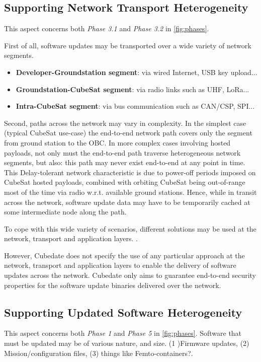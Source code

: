 \subsection{Supporting Network Transport Heterogeneity}
This aspect concerns both \textit{Phase 3.1} and \textit{Phase 3.2} in \autoref{fig:phases}. 

First of all, software updates may be transported over a wide variety of network segments.
\begin{itemize}
\item {\bf Developer-Groundstation segment}: via wired Internet, USB key upload...
\item {\bf Groundstation-CubeSat segment}: via radio links such as UHF, LoRa...
\item {\bf Intra-CubeSat segment}: via bus communication such as CAN/CSP, SPI...
\end{itemize}

Second, paths across the network may vary in complexity.
In the simplest case (typical CubeSat use-case) the end-to-end network path covers only the segment from ground station to the OBC.
In more complex cases involving hosted payloads, not only
must the end-to-end path traverse heterogeneous network segments,
but also: this path may never exist end-to-end at any point in time.
This Delay-tolerant network characteristic is due to power-off periods imposed on CubeSat hosted payloads, 
combined with orbiting CubeSat being out-of-range most of the time via radio w.r.t. available ground stations.
Hence, while in transit across the network, software update data may have to be temporarily cached at some intermediate node along the path.

To cope with this wide variety of scenarios, different solutions may be used at the network, transport and application layers. . 


However, Cubedate does not specify the use of any particular approach at the network, transport and application layers to enable the delivery of software updates across the network.
Cubedate only aims to guarantee end-to-end security properties for the software update binaries delivered over the network.

\subsection{Supporting Updated Software Heterogeneity}
This aspect concerns both \textit{Phase 1} and \textit{Phase 5} in \autoref{fig:phases}. 
Software that must be updated may be of various nature, and size.
(1 )Firmware updates, (2) Mission/configuration files, (3) things like Femto-containers?.

